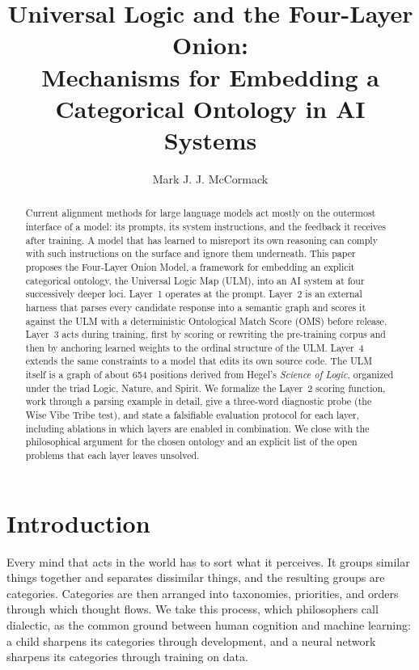 \documentclass[twocolumn]{ulpaper}
\title{Universal Logic and the Four-Layer Onion:\\Mechanisms for Embedding a Categorical Ontology in AI Systems}
\author{Mark J. J. McCormack\affil{1}}
\begin{document}
\maketitle

\begin{abstract}
Current alignment methods for large language models act mostly on the outermost interface of a model: its prompts, its system instructions, and the feedback it receives after training. A model that has learned to misreport its own reasoning can comply with such instructions on the surface and ignore them underneath. This paper proposes the Four-Layer Onion Model, a framework for embedding an explicit categorical ontology, the Universal Logic Map (ULM), into an AI system at four successively deeper loci. Layer~1 operates at the prompt. Layer~2 is an external harness that parses every candidate response into a semantic graph and scores it against the ULM with a deterministic Ontological Match Score (OMS) before release. Layer~3 acts during training, first by scoring or rewriting the pre-training corpus and then by anchoring learned weights to the ordinal structure of the ULM. Layer~4 extends the same constraints to a model that edits its own source code. The ULM itself is a graph of about 654 positions derived from Hegel's \emph{Science of Logic}, organized under the triad Logic, Nature, and Spirit. We formalize the Layer~2 scoring function, work through a parsing example in detail, give a three-word diagnostic probe (the Wise Vibe Tribe test), and state a falsifiable evaluation protocol for each layer, including ablations in which layers are enabled in combination. We close with the philosophical argument for the chosen ontology and an explicit list of the open problems that each layer leaves unsolved.
\end{abstract}

\section{Introduction}
\label{sec:intro}

Every mind that acts in the world has to sort what it perceives. It groups similar things together and separates dissimilar things, and the resulting groups are categories. Categories are then arranged into taxonomies, priorities, and orders through which thought flows. We take this process, which philosophers call dialectic, as the common ground between human cognition and machine learning: a child sharpens its categories through development, and a neural network sharpens its categories through training on data.
\end{document}

